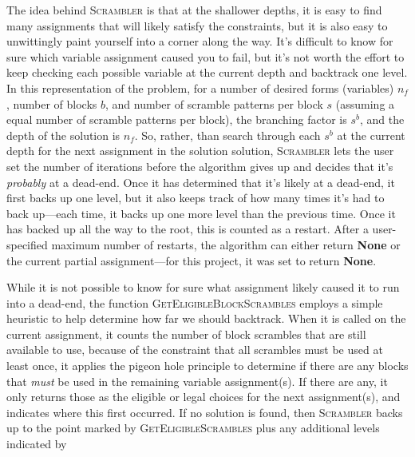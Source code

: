 \documentclass[11pt]{article}
\begin{document}
%  
\par
The idea behind \textsc{Scrambler} is that at the shallower depths, it
is easy to find many assignments that will likely satisfy the
constraints, but it is also easy to unwittingly paint yourself into a
corner along the way.  It's difficult to know for sure which variable
assignment caused you to fail, but it's not worth the effort to keep
checking each possible variable at the current depth and backtrack one
level.  In this representation of the problem, for a number of desired
forms (variables) \(n_f\),
number of blocks \(b\),
and number of scramble patterns per block \(s\)
(assuming a equal number of scramble patterns per block), the
branching factor is \(s^b\),
and the depth of the solution is \(n_f\).
So, rather, than search through each \(s^b\)
at the current depth for the next assignment in the solution solution,
\textsc{Scrambler} lets the user set the number of iterations before
the algorithm gives up and decides that it's \emph{probably} at a
dead-end.  Once it has determined that it's likely at a dead-end, it
first backs up one level, but it also keeps track of how many times
it's had to back up---each time, it backs up one more level than the
previous time.  Once it has backed up all the way to the root, this is
counted as a restart. After a user-specified maximum number of
restarts, the algorithm can either return \textbf{None} or the current
partial assignment---for this project, it was set to return
\textbf{None}.
\par
While it is not possible to know for sure what assignment likely
caused it to run into a dead-end, the function
\textsc{GetEligibleBlockScrambles} employs a simple heuristic to help
determine how far we should backtrack.  When it is called on the
current assignment, it counts the number of block scrambles that are
still available to use, because of the constraint that all scrambles
must be used at least once, it applies the pigeon hole principle to
determine if there are any blocks that \emph{must} be used in the
remaining variable assignment(s).  If there are any, it only returns
those as the eligible or legal choices for the next assignment(s), and
indicates where this first occurred. If no solution is found, then
\textsc{Scrambler} backs up to the point marked by
\textsc{GetEligibleScrambles} plus any additional levels indicated by
\end{document}
